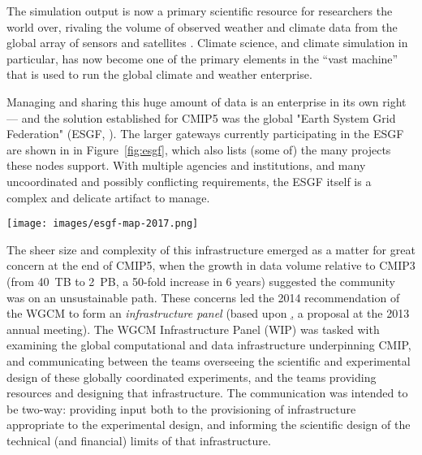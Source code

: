 \documentclass[gmd,manuscript]{copernicus}
\newcommand{\pipref}[1] {\citep{ref:#1}}
\newcommand{\figref}[1] {\mbox{Figure   \ref{fig:#1}}}
\begin{document}
The simulation output is now a primary scientific resource for
researchers the world over, rivaling the volume of 
observed weather and climate data from the global array of
sensors and satellites \pipref{overpecketal2011}. Climate science,
and climate simulation in particular, has now become one of the
primary elements in the ``vast machine'' \pipref{edwards2010}
that is used to run the global climate and weather enterprise. 

Managing and sharing this huge amount of data is an enterprise in its
own right --- and the solution established for CMIP5 was the global
"Earth System Grid Federation" (ESGF, \pipref{williamsetal2015}). The
larger gateways currently participating in the ESGF are shown in in
\figref{esgf}, which also lists (some of) the many projects these
nodes support. With multiple agencies and institutions, and many
uncoordinated and possibly conflicting requirements, the ESGF itself
is a complex and delicate artifact to manage.

\begin{figure*}
  \begin{center}
    \texttt{[image: images/esgf-map-2017.png]}
  \end{center}
  \caption{Sites participating in the Earth System Grid Federation in
    2017. Figure courtesy Dean Williams, adapted from the ESGF
    Brochure. }
  \label{fig:esgf}
\end{figure*}

The sheer size and complexity of this infrastructure emerged as a
matter for great concern at the end of CMIP5, when the growth in data
volume relative to CMIP3 (from 40~TB to 2~PB, a 50-fold increase in 6
years) suggested the community was on an unsustainable path. These
concerns led the 2014 recommendation of the WGCM to form an
\emph{infrastructure panel} (based upon \href{https://goo.gl/FHqbNN},
a proposal at the 2013 annual meeting). The WGCM Infrastructure Panel
(WIP) was tasked with examining the global computational and data
infrastructure underpinning CMIP, and communicating between the teams
overseeing the scientific and experimental design of these globally
coordinated experiments, and the teams providing resources and
designing that infrastructure. The communication was intended to be
two-way: providing input both to the provisioning of infrastructure
appropriate to the experimental design, and informing the scientific
design of the technical (and financial) limits of that infrastructure.
\end{document}
